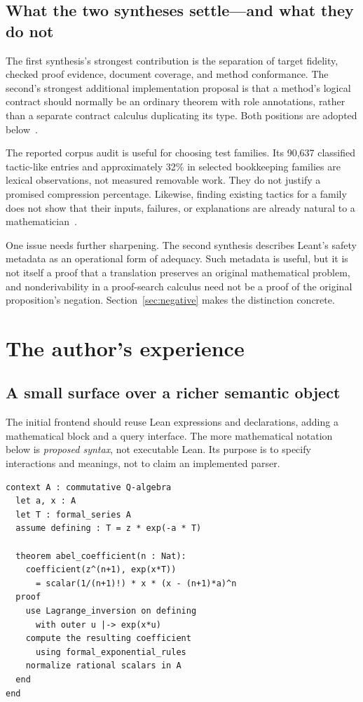 \documentclass[11pt,a4paper]{article}
\theoremstyle{definition}
\begin{document}
\subsection{What the two syntheses settle---and what they do not}
The first synthesis's strongest contribution is the separation of target fidelity, checked proof evidence, document coverage, and method conformance. The second's strongest additional implementation proposal is that a method's logical contract should normally be an ordinary theorem with role annotations, rather than a separate contract calculus duplicating its type. Both positions are adopted below~\cite{synA,synB}.

The reported corpus audit is useful for choosing test families. Its 90,637 classified tactic-like entries and approximately 32\% in selected bookkeeping families are lexical observations, not measured removable work. They do not justify a promised compression percentage. Likewise, finding existing tactics for a family does not show that their inputs, failures, or explanations are already natural to a mathematician~\cite{synB,synA}.

One issue needs further sharpening. The second synthesis describes Leant's safety metadata as an operational form of adequacy. Such metadata is useful, but it is not itself a proof that a translation preserves an original mathematical problem, and nonderivability in a proof-search calculus need not be a proof of the original proposition's negation. Section~\ref{sec:negative} makes the distinction concrete.

\section{The author's experience}\label{sec:surface}

\subsection{A small surface over a richer semantic object}
The initial frontend should reuse Lean expressions and declarations, adding a mathematical block and a query interface. The more mathematical notation below is \emph{proposed syntax}, not executable Lean. Its purpose is to specify interactions and meanings, not to claim an implemented parser.

\par\noindent\begin{minipage}{\linewidth}
\begin{lstlisting}
context A : commutative Q-algebra
  let a, x : A
  let T : formal_series A
  assume defining : T = z * exp(-a * T)

  theorem abel_coefficient(n : Nat):
    coefficient(z^(n+1), exp(x*T))
      = scalar(1/(n+1)!) * x * (x - (n+1)*a)^n
  proof
    use Lagrange_inversion on defining
      with outer u |-> exp(x*u)
    compute the resulting coefficient
      using formal_exponential_rules
    normalize rational scalars in A
  end
end
\end{lstlisting}
\end{minipage}\par
\end{document}
